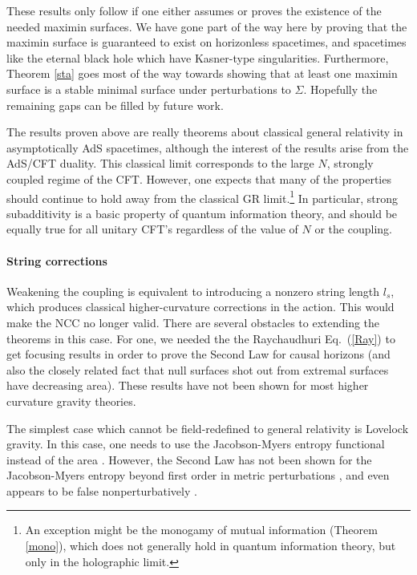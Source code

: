 \documentclass{article}
\begin{document}
These results only follow if one either assumes or proves the existence of the needed maximin surfaces.  We have gone part of the way here by proving that the maximin surface is guaranteed to exist on horizonless spacetimes, and spacetimes like the eternal black hole which have Kasner-type singularities.  Furthermore, Theorem \ref{sta} goes most of the way towards showing that at least one maximin surface is a stable minimal surface under perturbations to $\Sigma$.  Hopefully the remaining gaps can be filled by future work.

The results proven above are really theorems about classical general relativity in asymptotically AdS spacetimes, although the interest of the results arise from the AdS/CFT duality.  This classical limit corresponds to the large $N$, strongly coupled regime of the CFT.  However, one expects that many of the properties should continue to hold away from the classical GR limit.\footnote{An exception might be the monogamy of mutual information (Theorem \ref{mono}), which does not generally hold in quantum information theory, but only in the holographic limit.} In particular, strong subadditivity is a basic property of quantum information theory, and should be equally true for all unitary CFT's regardless of the value of $N$ or the coupling.

\paragraph{String corrections} Weakening the coupling is equivalent to introducing a nonzero string length $l_s$, which produces classical higher-curvature corrections in the action.  This would make the NCC no longer valid.  There are several obstacles to extending the theorems in this case.  For one, we needed the the Raychaudhuri Eq.~(\ref{Ray}) to get focusing results in order to prove the Second Law for causal horizons (and also the closely related fact that null surfaces shot out from extremal surfaces have decreasing area).  These results have not been shown for most higher curvature gravity theories.  

The simplest case which cannot be field-redefined to general relativity is Lovelock gravity.  In this case, one needs to use the Jacobson-Myers entropy functional instead of the area \cite{JM93, dKP11, HMS11, FPS13, dong13}.  However, the Second Law has not been shown for the Jacobson-Myers entropy beyond first order in metric perturbations \cite{fLove}, and even appears to be false nonperturbatively \cite{JM93,lovelock}.
\end{document}
